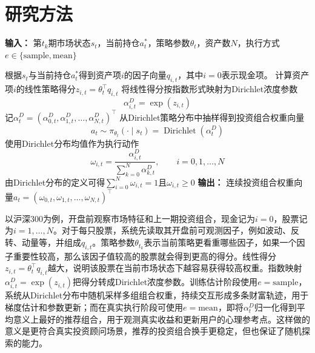 \documentclass{sufethesismas}
\begin{document}
\section{研究方法}
\begin{algorithm}[H]
\caption{Dirichlet策略函数抽取投资组合}
\label{alg:dirichlet_policy}
\begin{algorithmic}[1]
\STATE \textbf{输入：} 第$t_k$期市场状态$s_t$，当前持仓$a_{t}^*$，策略参数$\theta_t$，资产数$N$，执行方式$e\in\{\mathrm{sample},\mathrm{mean}\}$

    \STATE 根据$s_t$与当前持仓$a_t^*$得到资产项$i$的因子向量$q_{i,t}$，其中$i=0$表示现金项。
    \STATE 计算资产项$i$的线性策略得分$z_{i,t}=\theta_t^\top q_{i,t}$
    \STATE 将线性得分按指数形式映射为Dirichlet浓度参数
    \begin{equation*}
    \alpha^D_{i,t}
    =
    \exp(z_{i,t})
    \end{equation*}
\ENDFOR
\STATE 记$\alpha^D_t=(\alpha^D_{0,t},\alpha^D_{1,t},\dots,\alpha^D_{N,t})^\top$
    \STATE 从Dirichlet策略分布中抽样得到投资组合权重向量
\begin{equation*}
a_t
\sim
\pi_{\theta_t}(\cdot\mid s_t)
=
\operatorname{Dirichlet}(\alpha^D_t)
\end{equation*}
\ELSE
    \STATE 使用Dirichlet分布均值作为执行动作
\begin{equation*}
\omega_{i,t}
=
\frac{\alpha^D_{i,t}}{\sum_{k=0}^{N}\alpha^D_{k,t}},
\qquad
i=0,1,\dots,N
\end{equation*}
\ENDIF
\STATE 由Dirichlet分布的定义可得$\sum_{i=0}^{N}\omega_{i,t}=1$且$\omega_{i,t}\ge 0$
\STATE \textbf{输出：} 连续投资组合权重向量$a_t=(\omega_{0,t},\omega_{1,t},\dots,\omega_{N,t})^\top$
\end{algorithmic}
\end{algorithm}

以沪深300为例，开盘前观察市场特征和上一期投资组合，现金记为$i=0$，股票记为$i=1,\dots,N$。对于每只股票，系统先读取其开盘前可观测因子，例如波动、反转、动量等，并组成$q_{i,t}$。策略参数$\theta_{t_k}$表示当前策略更看重哪些因子，如果一个因子重要性较高，那么该因子值较高的股票就会得到更高的得分。线性得分$z_{i,t}=\theta_t^\top q_{i,t}$越大，说明该股票在当前市场状态下越容易获得较高权重。指数映射$\alpha^D_{i,t}=\exp(z_{i,t})$把得分转成Dirichlet浓度参数。训练估计阶段使用$e=\mathrm{sample}$，系统从Dirichlet分布中随机采样多组组合权重，持续交互形成多条财富轨迹，用于梯度估计和参数更新；而在真实执行阶段可使用$e=\mathrm{mean}$，即将$\alpha^D_t$归一化得到平均意义上最好的推荐组合，用于观测真实收益和更新用户的心理参考点。这样做的意义是更符合真实投资顾问场景，推荐的投资组合换手更稳定，但也保证了随机探索的能力。
\end{document}

